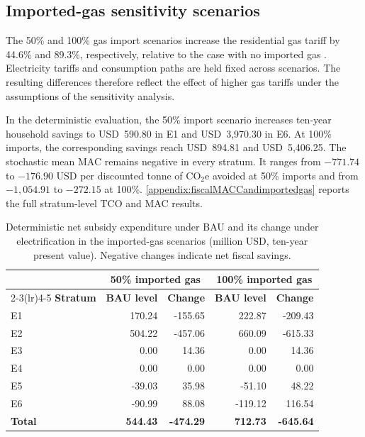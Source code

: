 \documentclass[authoryear,preprint,review,10pt]{elsarticle}
\begin{document}
\subsection{Imported-gas sensitivity scenarios}
\label{results:import_scenarios}

The 50\% and 100\% gas import scenarios increase the residential gas tariff by 44.6\% and 89.3\%, respectively, relative to the case with no imported gas \citep{cabrales2025fedesarrollo_gas_imports}. Electricity tariffs and consumption paths are held fixed across scenarios. The resulting differences therefore reflect the effect of higher gas tariffs under the assumptions of the sensitivity analysis.

In the deterministic evaluation, the 50\% import scenario increases ten-year household savings to USD~590.80 in E1 and USD~3,970.30 in E6. At 100\% imports, the corresponding savings reach USD~894.81 and USD~5,406.25. The stochastic mean MAC remains negative in every stratum. It ranges from $-771.74$ to $-176.90$ USD per discounted tonne of CO$_2$e avoided at 50\% imports and from $-1{,}054.91$ to $-272.15$ at 100\%. \ref{appendix:fiscalMACCandimportedgas} reports the full stratum-level TCO and MAC results.

\begin{table}[htbp]
    \centering
    \caption{Deterministic net subsidy expenditure under BAU and its change under electrification in the imported-gas scenarios (million USD, ten-year present value). Negative changes indicate net fiscal savings.}
    \label{tab:import_scenarios_fiscal_aggregate}
    \begin{tabular}{lrrrr}
        \toprule
        & \multicolumn{2}{c}{\textbf{50\% imported gas}}
        & \multicolumn{2}{c}{\textbf{100\% imported gas}} \\
        \cmidrule(lr){2-3}\cmidrule(lr){4-5}
        \textbf{Stratum} & \textbf{BAU level} & \textbf{Change}
        & \textbf{BAU level} & \textbf{Change} \\
        \midrule
        E1 & 170.24 & -155.65 & 222.87  & -209.43 \\
        E2 & 504.22 & -457.06 & 660.09  & -615.33 \\
        E3 & 0.00   & 14.36   & 0.00    & 14.36 \\
        E4 & 0.00   & 0.00    & 0.00    & 0.00 \\
        E5 & -39.03 & 35.98   & -51.10  & 48.22 \\
        E6 & -90.99 & 88.08   & -119.12 & 116.54 \\
        \midrule
        \textbf{Total} & \textbf{544.43} & \textbf{-474.29}
        & \textbf{712.73} & \textbf{-645.64} \\
        \bottomrule
    \end{tabular}
\end{table}
\end{document}
